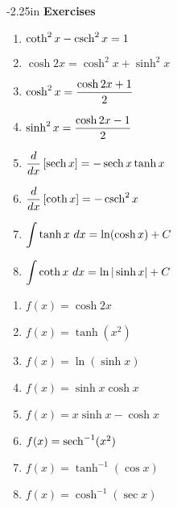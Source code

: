 \begin{adjustwidth*}{}{-2.25in}
\textbf{{\large Exercises}}
\setlength{\columnsep}{25pt}
\begin{multicols*}{2}

 \small


\begin{enumerate}[1)]
\item $\coth^2 x-\operatorname{csch}^2x=1$

\item $\cosh 2x = \cosh^2x+\sinh^2x$

\item $\displaystyle\cosh^2x = \frac{\cosh2x+1}{2}$

\item $\displaystyle\sinh^2x = \frac{\cosh2x-1}{2}$

\item $\displaystyle\frac{d}{dx}\left[\operatorname{sech} x\right] = -\operatorname{sech} x\tanh x$

\item $\displaystyle\frac{d}{dx}\left[\coth x\right] = -\operatorname{csch}^2x$

\item $\displaystyle \int \tanh x\ dx  = \ln (\cosh x) + C$

\item $\displaystyle \int \coth x\ dx  = \ln |\sinh x| + C$
\end{enumerate}


\begin{enumerate}[1),resume]

\item $f(x) = \cosh 2x$

\item $f(x) = \tanh (x^2)$

\item $f(x) = \ln(\sinh x)$

\item $f(x) = \sinh x\cosh x$

\item $f(x) = x\sinh x-\cosh x$

\item $f(x) = \operatorname{sech}^{-1} (x^2)$

\item $f(x) = \tanh^{-1} (\cos x)$

\item $f(x) = \cosh^{-1} (\sec x)$


\end{enumerate}
\end{multicols*}
\end{adjustwidth*}
